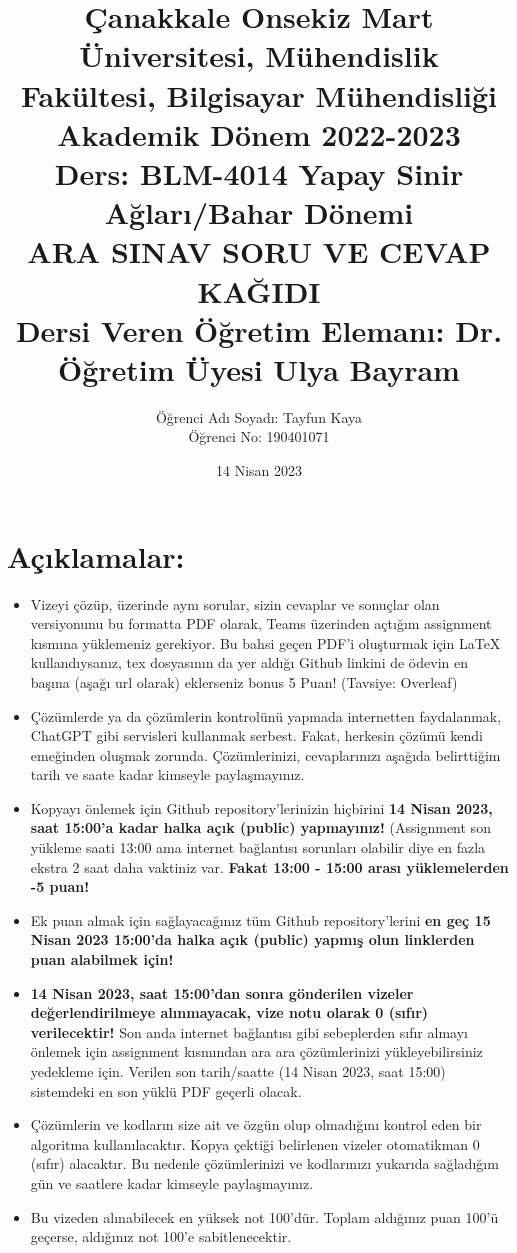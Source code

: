 \documentclass[11pt]{article}
\title{Çanakkale Onsekiz Mart Üniversitesi, Mühendislik Fakültesi, Bilgisayar Mühendisliği Akademik Dönem 2022-2023\\
Ders: BLM-4014 Yapay Sinir Ağları/Bahar Dönemi\\ 
ARA SINAV SORU VE CEVAP KAĞIDI\\
Dersi Veren Öğretim Elemanı: Dr. Öğretim Üyesi Ulya Bayram}
\author{%
\begin{minipage}{\textwidth}
\raggedright
Öğrenci Adı Soyadı: Tayfun Kaya\\ %
Öğrenci No: 190401071
\end{minipage}%
}
\date{14 Nisan 2023}
\begin{document}
\maketitle

\vspace{-.5in}
\section*{Açıklamalar:}
\begin{itemize}
    \item Vizeyi çözüp, üzerinde aynı sorular, sizin cevaplar ve sonuçlar olan versiyonunu bu formatta PDF olarak, Teams üzerinden açtığım assignment kısmına yüklemeniz gerekiyor. Bu bahsi geçen PDF'i oluşturmak için LaTeX kullandıysanız, tex dosyasının da yer aldığı Github linkini de ödevin en başına (aşağı url olarak) eklerseniz bonus 5 Puan! (Tavsiye: Overleaf)
    \item Çözümlerde ya da çözümlerin kontrolünü yapmada internetten faydalanmak, ChatGPT gibi servisleri kullanmak serbest. Fakat, herkesin çözümü kendi emeğinden oluşmak zorunda. Çözümlerinizi, cevaplarınızı aşağıda belirttiğim tarih ve saate kadar kimseyle paylaşmayınız. 
    \item Kopyayı önlemek için Github repository'lerinizin hiçbirini \textbf{14 Nisan 2023, saat 15:00'a kadar halka açık (public) yapmayınız!} (Assignment son yükleme saati 13:00 ama internet bağlantısı sorunları olabilir diye en fazla ekstra 2 saat daha vaktiniz var. \textbf{Fakat 13:00 - 15:00 arası yüklemelerden -5 puan!}
    \item Ek puan almak için sağlayacağınız tüm Github repository'lerini \textbf{en geç 15 Nisan 2023 15:00'da halka açık (public) yapmış olun linklerden puan alabilmek için!}
    \item \textbf{14 Nisan 2023, saat 15:00'dan sonra gönderilen vizeler değerlendirilmeye alınmayacak, vize notu olarak 0 (sıfır) verilecektir!} Son anda internet bağlantısı gibi sebeplerden sıfır almayı önlemek için assignment kısmından ara ara çözümlerinizi yükleyebilirsiniz yedekleme için. Verilen son tarih/saatte (14 Nisan 2023, saat 15:00) sistemdeki en son yüklü PDF geçerli olacak.
    \item Çözümlerin ve kodların size ait ve özgün olup olmadığını kontrol eden bir algoritma kullanılacaktır. Kopya çektiği belirlenen vizeler otomatikman 0 (sıfır) alacaktır. Bu nedenle çözümlerinizi ve kodlarınızı yukarıda sağladığım gün ve saatlere kadar kimseyle paylaşmayınız.
    \item Bu vizeden alınabilecek en yüksek not 100'dür. Toplam aldığınız puan 100'ü geçerse, aldığınız not 100'e sabitlenecektir.

\end{itemize}
\end{document}
